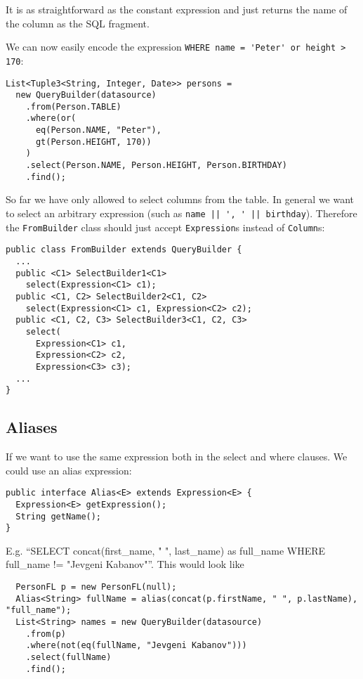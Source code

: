 \documentclass{sig-alternate}
\begin{document}
It is as straightforward as the constant expression and just returns the name of the column as the SQL fragment.

We can now easily encode the expression \verb!WHERE name = 'Peter' or height > 170!:

\begin{verbatim}
List<Tuple3<String, Integer, Date>> persons = 
  new QueryBuilder(datasource)
    .from(Person.TABLE)
    .where(or(
      eq(Person.NAME, "Peter"),
      gt(Person.HEIGHT, 170))
    )
    .select(Person.NAME, Person.HEIGHT, Person.BIRTHDAY)
    .find();
\end{verbatim}


So far we have only allowed to select columns from the table. In general we want to select an arbitrary expression (such as \verb!name || ', ' || birthday!). Therefore the \verb!FromBuilder! class should just accept \verb!Expression!s instead of \verb!Column!s:

\begin{verbatim}
public class FromBuilder extends QueryBuilder {
  ...
  public <C1> SelectBuilder1<C1> 
    select(Expression<C1> c1);
  public <C1, C2> SelectBuilder2<C1, C2> 
    select(Expression<C1> c1, Expression<C2> c2);
  public <C1, C2, C3> SelectBuilder3<C1, C2, C3> 
    select(
      Expression<C1> c1, 
      Expression<C2> c2, 
      Expression<C3> c3);
  ...
}
\end{verbatim}


\subsection{Aliases}

If we want to use the same expression both in the select and where clauses. We could use an alias expression:

\begin{verbatim}
public interface Alias<E> extends Expression<E> {
  Expression<E> getExpression();
  String getName();
}
\end{verbatim}

E.g. ``SELECT concat(first\_name, " ", last\_name) as full\_name WHERE full\_name != "Jevgeni Kabanov"''. This would look like

\begin{verbatim}
  PersonFL p = new PersonFL(null);
  Alias<String> fullName = alias(concat(p.firstName, " ", p.lastName), "full_name");
  List<String> names = new QueryBuilder(datasource)
    .from(p)
    .where(not(eq(fullName, "Jevgeni Kabanov")))
    .select(fullName)
    .find();
\end{verbatim}
\end{document}
